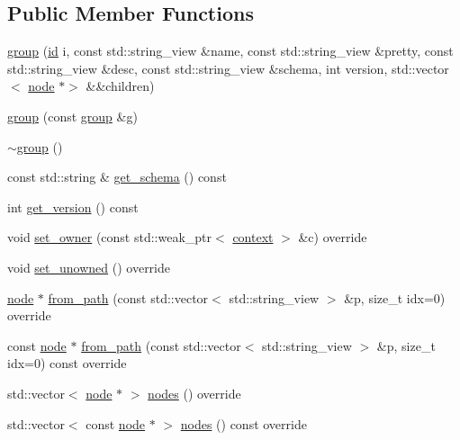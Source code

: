 \subsection*{Public Member Functions}
\begin{DoxyCompactItemize}
\item 
\hyperlink{classtelegraph_1_1group_a06ec96e471690fcc8e9cc6efe1632261}{group} (\hyperlink{classtelegraph_1_1node_a90bc576d668ed141d5354a06aa9c8d9a}{id} i, const std\+::string\+\_\+view \&name, const std\+::string\+\_\+view \&pretty, const std\+::string\+\_\+view \&desc, const std\+::string\+\_\+view \&schema, int version, std\+::vector$<$ \hyperlink{classtelegraph_1_1node}{node} $\ast$$>$ \&\&children)
\item 
\hyperlink{classtelegraph_1_1group_a88d584b6dc7383e319a00fc266b29be7}{group} (const \hyperlink{classtelegraph_1_1group}{group} \&g)
\item 
\hyperlink{classtelegraph_1_1group_a2c613f213d32b7b48b94df99610bbc90}{$\sim$group} ()
\item 
const std\+::string \& \hyperlink{classtelegraph_1_1group_a6ab1978bc6c97d3dcd802665c92390b8}{get\+\_\+schema} () const
\item 
int \hyperlink{classtelegraph_1_1group_a04e3ffe2ee3b18f0c2d921bdd8b0789f}{get\+\_\+version} () const
\item 
void \hyperlink{classtelegraph_1_1group_ae4887f80cadba073aef9feef1295fb20}{set\+\_\+owner} (const std\+::weak\+\_\+ptr$<$ \hyperlink{classtelegraph_1_1context}{context} $>$ \&c) override
\item 
void \hyperlink{classtelegraph_1_1group_af56fb03ad97aadd9be32c5e47c6d195b}{set\+\_\+unowned} () override
\item 
\hyperlink{classtelegraph_1_1node}{node} $\ast$ \hyperlink{classtelegraph_1_1group_a27e8f2ecfe0b87fef8ca57c43fda8809}{from\+\_\+path} (const std\+::vector$<$ std\+::string\+\_\+view $>$ \&p, size\+\_\+t idx=0) override
\item 
const \hyperlink{classtelegraph_1_1node}{node} $\ast$ \hyperlink{classtelegraph_1_1group_ad4ed6177fee328ec3702d01a881a33ee}{from\+\_\+path} (const std\+::vector$<$ std\+::string\+\_\+view $>$ \&p, size\+\_\+t idx=0) const override
\item 
std\+::vector$<$ \hyperlink{classtelegraph_1_1node}{node} $\ast$ $>$ \hyperlink{classtelegraph_1_1group_a120c05f05d045fe4b5719b4abe4e83d9}{nodes} () override
\item 
std\+::vector$<$ const \hyperlink{classtelegraph_1_1node}{node} $\ast$ $>$ \hyperlink{classtelegraph_1_1group_ad5a82543eef530a7b07ca2cdbe6a82f5}{nodes} () const override
$$
\end{DoxyCompactItemize}
